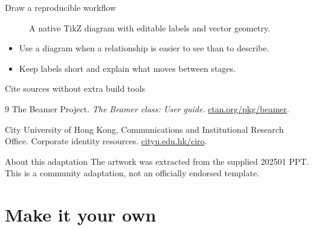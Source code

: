 \documentclass[aspectratio=169,11pt,t]{beamer}
\begin{document}
\begin{frame}{Draw a reproducible workflow}
  \begin{figure}
    \centering
    \caption{A native TikZ diagram with editable labels and vector geometry.}
  \end{figure}
  \medskip
  \begin{itemize}
    \item Use a diagram when a relationship is easier to see than to describe.
    \item Keep labels short and explain what moves between stages.
  \end{itemize}
\end{frame}

\begin{frame}{Cite sources without extra build tools}
  \small
  \begin{thebibliography}{9}
      The Beamer Project.
      \newblock \emph{The Beamer class: User guide}.
      \newblock \href{https://ctan.org/pkg/beamer}{ctan.org/pkg/beamer}.

      City University of Hong Kong, Communications and Institutional Research Office.
      \newblock Corporate identity resources.
      \newblock \href{https://www.cityu.edu.hk/ciro/}{cityu.edu.hk/ciro}.
  \end{thebibliography}
  \medskip
  \begin{block}{About this adaptation}
    The artwork was extracted from the supplied 202501 PPT.
    This is a community adaptation, not an officially endorsed template.
  \end{block}
\end{frame}

\section{Make it your own}

\end{document}
